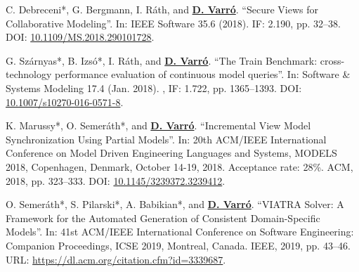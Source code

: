 {\begin{yearlist}
\item[\cite{ieeesw2018}]
C. Debreceni*, G. Bergmann, I. Ráth, and \underline{\textbf{D. Varró}}. “Secure Views for Collaborative Modeling”. In: IEEE Software 35.6 (2018). IF: 2.190, pp. 32–38. 
\newline DOI: \href{https://doi.org/10.1109/MS.2018.290101728}{10.1109/MS.2018.290101728}.

\item[\cite{sosym2017-tb}]
G. Szárnyas*, B. Izsó*, I. Ráth, and \underline{\textbf{D. Varró}}. “The Train Benchmark: cross-technology performance evaluation of continuous model queries”. In: Software \& Systems Modeling 17.4 (Jan. 2018). , IF: 1.722, pp. 1365–1393. 
\newline DOI: \href{https://doi.org/10.1007/s10270-016-0571-8}{10.1007/s10270-016-0571-8}.

\item[\cite{models2018}]
K. Marussy*, O. Semeráth*, and \underline{\textbf{D. Varró}}. “Incremental View Model Synchronization Using Partial Models”. In: 20th ACM/IEEE International Conference on Model Driven Engineering Languages and Systems, MODELS 2018, Copenhagen, Denmark, October 14-19, 2018. Acceptance rate: 28\%. ACM, 2018, pp. 323--333. 
\newline DOI: \href{https://doi.org/10.1145/3239372.3239412}{10.1145/3239372.3239412}.

\item[\cite{icse2019-tool}]
O. Semeráth*, S. Pilarski*, A. Babikian*, and \underline{\textbf{D. Varró}}. “VIATRA Solver: A Framework for the Automated
Generation of Consistent Domain-Specific Models”. In: 41st ACM/IEEE International Conference on Software
Engineering: Companion Proceedings, ICSE 2019, Montreal, Canada. IEEE, 2019, pp. 43–46. 
\newline URL: \url{https://dl.acm.org/citation.cfm?id=3339687}.




\end{yearlist}}
